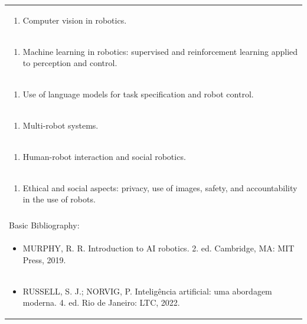\documentclass[11pt]{article}
\begin{document}
\begin{center}
\begin{longtable}{|p{4cm}|p{4cm}|p{4cm}|p{4cm}|}
\multicolumn{4}{|p{\dimexpr 16cm + 6\tabcolsep\relax}|}{\begin{enumerate}[start=2]\item Computer vision in robotics.\end{enumerate}}\\
\multicolumn{4}{|p{\dimexpr 16cm + 6\tabcolsep\relax}|}{\begin{enumerate}[start=3]\item Machine learning in robotics: supervised and reinforcement learning applied to perception and control.\end{enumerate}}\\
\multicolumn{4}{|p{\dimexpr 16cm + 6\tabcolsep\relax}|}{\begin{enumerate}[start=4]\item Use of language models for task specification and robot control.\end{enumerate}}\\
\multicolumn{4}{|p{\dimexpr 16cm + 6\tabcolsep\relax}|}{\begin{enumerate}[start=5]\item Multi-robot systems.\end{enumerate}}\\
\multicolumn{4}{|p{\dimexpr 16cm + 6\tabcolsep\relax}|}{\begin{enumerate}[start=6]\item Human-robot interaction and social robotics.\end{enumerate}}\\
\multicolumn{4}{|p{\dimexpr 16cm + 6\tabcolsep\relax}|}{\begin{enumerate}[start=7]\item Ethical and social aspects: privacy, use of images, safety, and accountability in the use of robots.\end{enumerate}}\\
\multicolumn{4}{|p{\dimexpr 16cm + 6\tabcolsep\relax}|}{}\\
\hline
\multicolumn{4}{|p{16cm}|}{Basic Bibliography:}\\*
\multicolumn{4}{|p{\dimexpr 16cm + 6\tabcolsep\relax}|}{\begin{itemize}\item MURPHY, R. R. Introduction to AI robotics. 2. ed. Cambridge, MA: MIT Press, 2019.\end{itemize}}\\
\multicolumn{4}{|p{\dimexpr 16cm + 6\tabcolsep\relax}|}{\begin{itemize}\item RUSSELL, S. J.; NORVIG, P. Inteligência artificial: uma abordagem moderna. 4. ed. Rio de Janeiro: LTC, 2022.\end{itemize}}\\

\end{longtable}
\end{center}
\end{document}
